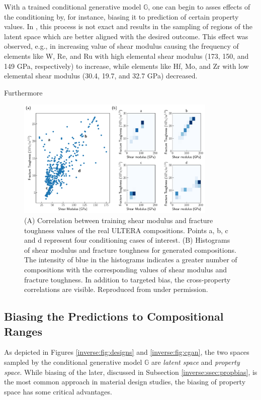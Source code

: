With a trained conditional generative model $\mathbb{G}$, one can begin to asses effects of the conditioning by, for instance, biasing it to prediction of certain property values. In \citet{Debnath2021GenerativeAlloys}, this process is not exact and results in the sampling of regions of the latent space which are better aligned with the desired outcome. This effect was observed, e.g., in increasing value of shear modulus causing the frequency of elements like W, Re, and Ru with high elemental shear modulus (173, 150, and 149 GPa, respectively) to increase, while elements like Hf, Mo, and Zr with low elemental shear modulus (30.4, 19.7, and 32.7 GPa) decreased.

Furthermore

\begin{figure}[H]
    \centering
    \includegraphics[width=0.85\textwidth]{inversedesign/fixed_cond_multi_points.pdf}
    \caption{(A) Correlation between training shear modulus and fracture toughness values of the real ULTERA compositions. Points a, b, c and d represent four conditioning cases of interest. (B) Histograms of shear modulus and fracture toughness for generated compositions. The intensity of blue in the histograms indicates a greater number of compositions with the corresponding values of shear modulus and fracture toughness. In addition to targeted bias, the cross-property correlations are visible. Reproduced from \cite{Debnath2021GenerativeAlloys} under permission.}
    \label{inverse:fig:propbias}
\end{figure}


\subsection{Biasing the Predictions to Compositional Ranges} \label{inverse:ssec:compbias}

As depicted in Figures \ref{inverse:fig:designs} and \ref{inverse:fig:cgan}, the two spaces sampled by the conditional generative model $\mathbb{G}$ are \emph{latent space} and \emph{property space}. While biasing of the later, discussed in Subsection \ref{inverse:ssec:propbias}, is the most common approach in material design studies, the biasing of property space has some critical advantages.

